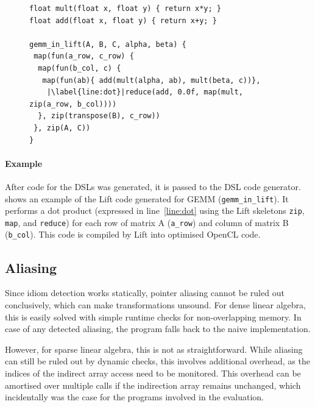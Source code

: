 \begin{figure}[H]
\begin{lstlisting}[language=LIFT,escapechar=|,
                   label={fig:liftmxm},caption=
   {GEMM in Lift:
    The idiom is composed of functional components
    \texttt{zip}, \texttt{map}, \texttt{reduce}.\leftskip=0pt\rightskip=0pt}]
float mult(float x, float y) { return x*y; }
float add(float x, float y) { return x+y; }

gemm_in_lift(A, B, C, alpha, beta) {
 map(fun(a_row, c_row) {
  map(fun(b_col, c) {
   map(fun(ab){ add(mult(alpha, ab), mult(beta, c))},
    |\label{line:dot}|reduce(add, 0.0f, map(mult, zip(a_row, b_col))))
  }, zip(transpose(B), c_row))
 }, zip(A, C))
}
\end{lstlisting}
\end{figure}

    \paragraph*{Example}
    After code for the DSLs was generated, it is passed to the DSL code
    generator.
     shows an example of the Lift code generated for GEMM
    (\texttt{gemm\_in\_lift}).
    It performs a dot product (expressed in line~\ref{line:dot} using the Lift
    skeletons \texttt{zip}, \texttt{map}, and \texttt{reduce}) for each row of
    matrix A (\texttt{a\_row}) and column of matrix B (\texttt{b\_col}).
    This code is compiled by Lift into optimised OpenCL code.

\subsection{Aliasing}

    Since idiom detection works statically, pointer aliasing cannot be ruled out
    conclusively, which can make transformations unsound.
    For dense linear algebra, this is easily solved with simple runtime
    checks for non-overlapping memory.
    In case of any detected aliasing, the program falls back to the naive
    implementation.

    However, for sparse linear algebra, this is not as straightforward.
    While aliasing can still be ruled out by dynamic checks, this involves
    additional overhead, as the indices of the indirect array access need to
    be monitored.
    This overhead can be amortised over multiple calls if the indirection array
    remains unchanged, which incidentally was the case for the programs
    involved in the evaluation.

